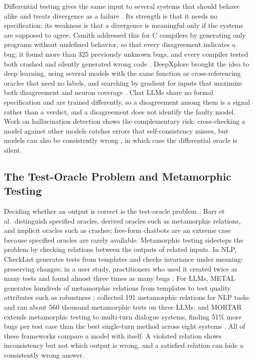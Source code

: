 Differential testing gives the same input to several systems that should behave alike and treats divergence as a failure \citep{mckeeman1998differential}. Its strength is that it needs no specification; its weakness is that a divergence is meaningful only if the systems are supposed to agree. Csmith addressed this for C compilers by generating only programs without undefined behavior, so that every disagreement indicates a bug; it found more than 325 previously unknown bugs, and every compiler tested both crashed and silently generated wrong code \citep{yang2011csmith}. DeepXplore brought the idea to deep learning, using several models with the same function as cross-referencing oracles that need no labels, and searching by gradient for inputs that maximize both disagreement and neuron coverage \citep{pei2017deepxplore}. Chat LLMs share no formal specification and are trained differently, so a disagreement among them is a signal rather than a verdict, and a disagreement does not identify the faulty model. Work on hallucination detection shows the complementary risk: cross-checking a model against other models catches errors that self-consistency misses, but models can also be consistently wrong \citep{zhang2023sac3}, in which case the differential oracle is silent.

\subsection{The Test-Oracle Problem and Metamorphic Testing}

Deciding whether an output is correct is the test-oracle problem \citep{barr2015oracle}. Barr et al.\ distinguish specified oracles, derived oracles such as metamorphic relations, and implicit oracles such as crashes; free-form chatbots are an extreme case because specified oracles are rarely available. Metamorphic testing \citep{chen1998metamorphic} sidesteps the problem by checking relations between the outputs of related inputs. In NLP, CheckList generates tests from templates and checks invariance under meaning-preserving changes; in a user study, practitioners who used it created twice as many tests and found almost three times as many bugs \citep{ribeiro2020checklist}. For LLMs, METAL generates hundreds of metamorphic relations from templates to test quality attributes such as robustness \citep{hyun2024metal}; \citet{cho2025metamorphic} collected 191 metamorphic relations for NLP tasks and ran about 560 thousand metamorphic tests on three LLMs; and MORTAR extends metamorphic testing to multi-turn dialogue systems, finding 51\% more bugs per test case than the best single-turn method across eight systems \citep{guo2026mortar}. All of these frameworks compare a model with itself. A violated relation shows inconsistency but not which output is wrong, and a satisfied relation can hide a consistently wrong answer.

